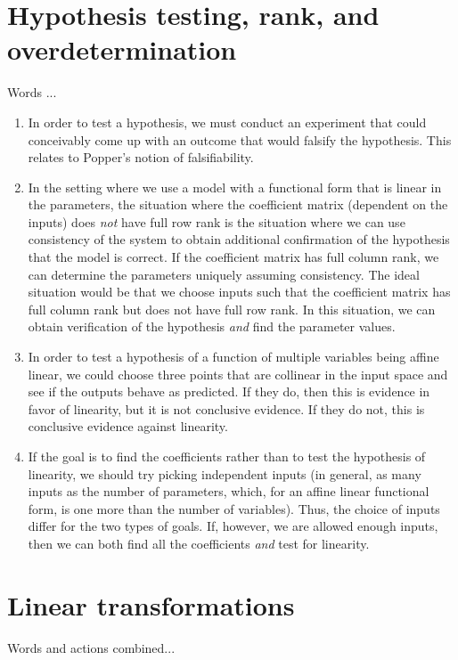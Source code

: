 \documentclass[10pt]{amsart}
\begin{document}
\section{Hypothesis testing, rank, and overdetermination}

Words ...
\begin{enumerate}
\item In order to test a hypothesis, we must conduct an experiment
  that could conceivably come up with an outcome that would falsify
  the hypothesis. This relates to Popper's notion of falsifiability.
\item In the setting where we use a model with a functional form that
  is linear in the parameters, the situation where the coefficient
  matrix (dependent on the inputs) does {\em not} have full row rank
  is the situation where we can use consistency of the system to
  obtain additional confirmation of the hypothesis that the model is
  correct. If the coefficient matrix has full column rank, we can
  determine the parameters uniquely assuming consistency. The ideal
  situation would be that we choose inputs such that the coefficient
  matrix has full column rank but does not have full row rank. In this
  situation, we can obtain verification of the hypothesis {\em and}
  find the parameter values.
\item In order to test a hypothesis of a function of multiple
  variables being affine linear, we could choose three points that are
  collinear in the input space and see if the outputs behave as
  predicted. If they do, then this is evidence in favor of linearity,
  but it is not conclusive evidence. If they do not, this is
  conclusive evidence against linearity.
\item If the goal is to find the coefficients rather than to test the
  hypothesis of linearity, we should try picking independent inputs
  (in general, as many inputs as the number of parameters, which, for
  an affine linear functional form, is one more than the number of
  variables). Thus, the choice of inputs differ for the two types of
  goals. If, however, we are allowed enough inputs, then we can both
  find all the coefficients {\em and} test for linearity.
\end{enumerate}

\section{Linear transformations}

Words and actions combined...
\end{document}
